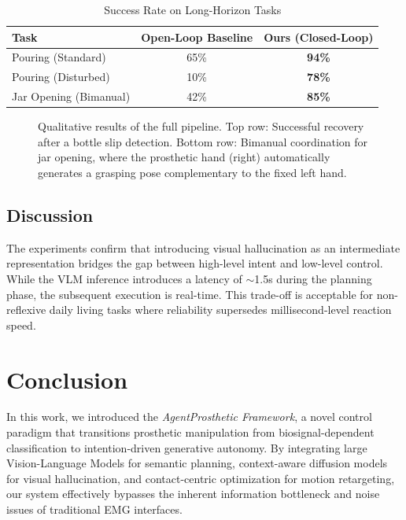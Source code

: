\documentclass[letterpaper, 10 pt, conference]{ieeeconf}  %
\begin{document}
\begin{table}[t]
\caption{Success Rate on Long-Horizon Tasks}
\label{tab:system_results}
\centering
\begin{tabular}{lcc}
\hline
Task & Open-Loop Baseline & \textbf{Ours (Closed-Loop)} \\
\hline
Pouring (Standard) & 65\% & \textbf{94\%} \\
Pouring (Disturbed) & 10\% & \textbf{78\%} \\
Jar Opening (Bimanual) & 42\% & \textbf{85\%} \\
\hline
\end{tabular}
\end{table}

\begin{figure}[t]
    \centering
    \caption{Qualitative results of the full pipeline. Top row: Successful recovery after a bottle slip detection. Bottom row: Bimanual coordination for jar opening, where the prosthetic hand (right) automatically generates a grasping pose complementary to the fixed left hand.}
    \label{fig:exp_system_qualitative}
\end{figure}

\subsection{Discussion}
The experiments confirm that introducing visual hallucination as an intermediate representation bridges the gap between high-level intent and low-level control. While the VLM inference introduces a latency of $\sim$1.5s during the planning phase, the subsequent execution is real-time. This trade-off is acceptable for non-reflexive daily living tasks where reliability supersedes millisecond-level reaction speed.



\section{Conclusion}
\label{sec:conclusion}

In this work, we introduced the \emph{AgentProsthetic Framework}, a novel control paradigm that transitions prosthetic manipulation from biosignal-dependent classification to intention-driven generative autonomy. By integrating large Vision-Language Models for semantic planning, context-aware diffusion models for visual hallucination, and contact-centric optimization for motion retargeting, our system effectively bypasses the inherent information bottleneck and noise issues of traditional EMG interfaces.
\end{document}

